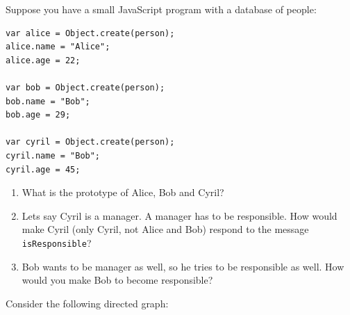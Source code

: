 \documentclass [11pt, a4wide, twoside]{article}
\begin{document}
\newpage
\noindent Suppose you have a small JavaScript program with a database of people:
\begin{verbatim}
var alice = Object.create(person);
alice.name = "Alice";
alice.age = 22;

var bob = Object.create(person);
bob.name = "Bob";
bob.age = 29;

var cyril = Object.create(person);
cyril.name = "Bob";
cyril.age = 45;
\end{verbatim}


\begin{enumerate}
        \item What is the prototype of Alice, Bob and Cyril?
        \vspace{5cm}

%
        \item Lets say Cyril is a manager. A manager has to be responsible. How would make Cyril (only Cyril, not Alice and Bob) respond to the message \texttt{isResponsible}?
        \vspace{5cm}
        \solution{}

\newpage
        \item Bob wants to be manager as well, so he tries to be responsible as well. How would you make Bob to become responsible?
        \vspace{5cm}
        \solution{}
\end{enumerate}


\newpage


Consider the following directed graph:

\begin{figure}[h]
\end{figure}
\end{document}
